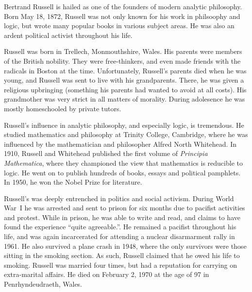 \documentclass[../../../include/open-logic-section]{subfiles}
\begin{document}



Bertrand Russell is hailed as one of the founders of modern analytic
philosophy. Born May 18, 1872, Russell was not only known for his work
in philsoophy and logic, but wrote many popular books in various
subject areas. He was also an ardent political activist throughout his
life.

Russell was born in Trellech, Monmouthshire, Wales. His parents were
members of the British nobility. They were free-thinkers, and even
made friends with the radicals in Boston at the time.  Unfortunately,
Russell's parents died when he was young, and Russell was sent to live
with his grandparents. There, he was given a religious upbringing
(something his parents had wanted to avoid at all costs). His
grandmother was very strict in all matters of morality. During
adolesence he was mostly homeschooled by private tutors.

Russell's influence in analytic philosophy, and especially logic, is
tremendous. He studied mathematics and philosophy at Trinity College,
Cambridge, where he was influenced by the mathematician and
philosopher Alfred North Whitehead.  In 1910, Russell and Whitehead
published the first volume of \emph{Principia Mathematica}, where they
championed the view that mathematics is reducible to logic. He went on
to publish hundreds of books, essays and political pamphlets. In 1950,
he won the Nobel Prize for literature.

Russell's was deeply entrenched in politics and social
activism. During World War~I he was arrested and sent to prison for
six months due to pacifist activities and protest. While in prison, he
was able to write and read, and claims to have found the experience
``quite agreeable.''. He remained a pacifist throughout his life, and
was again incarcerated for attending a nuclear disarmarment rally in
1961. He also survived a plane crash in 1948, where the only survivors
were those sitting in the smoking section. As such, Russell claimed
that he owed his life to smoking. Russell was married four times, but
had a reputation for carrying on extra-marital affairs.  He died on
February 2, 1970 at the age of 97 in Penrhyndeudraeth, Wales.
\end{document}
